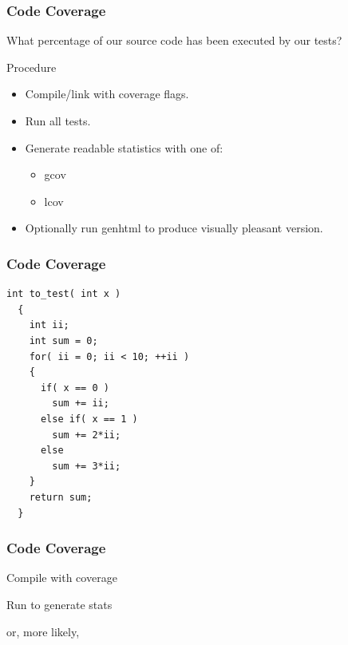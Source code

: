 \begin{frame}
  \frametitle{Code Coverage}
  {\Large\color{Base09}What percentage of our source code has been executed by our tests?}
  \begin{block}{Procedure}
  \begin{itemize}
  \item Compile/link with coverage flags.
  \item Run all tests.
  \item Generate readable statistics with one of:
    \begin{itemize}
    \item gcov
    \item lcov
    \end{itemize}
  \item Optionally run genhtml to produce visually pleasant version.
  \end{itemize}
  \end{block}
\end{frame}

\begin{frame}[fragile]
  \frametitle{Code Coverage}
  \begin{example}
    \begin{lstlisting}[style=C]
  int to_test( int x )
  {
    int ii;
    int sum = 0;
    for( ii = 0; ii < 10; ++ii )
    {
      if( x == 0 )
        sum += ii;
      else if( x == 1 )
        sum += 2*ii;
      else
        sum += 3*ii;
    }
    return sum;
  }
    \end{lstlisting}
  \end{example}
\end{frame}

\begin{frame}[fragile]
  \frametitle{Code Coverage}
  \begin{block}{Compile with coverage}
    \vspace{0.2cm}
    \vspace{0.2cm}
  \end{block}
  \begin{block}{Run to generate stats}
    \vspace{0.2cm}
    \hspace{0.2cm}{\ttfamily ./a.out}

    \vspace{0.2cm}
    \hspace{1cm} or, more likely,
    \vspace{0.2cm}

    \hspace{0.2cm}{\ttfamily make check}
    \vspace{0.2cm}
  \end{block}
\end{frame}

